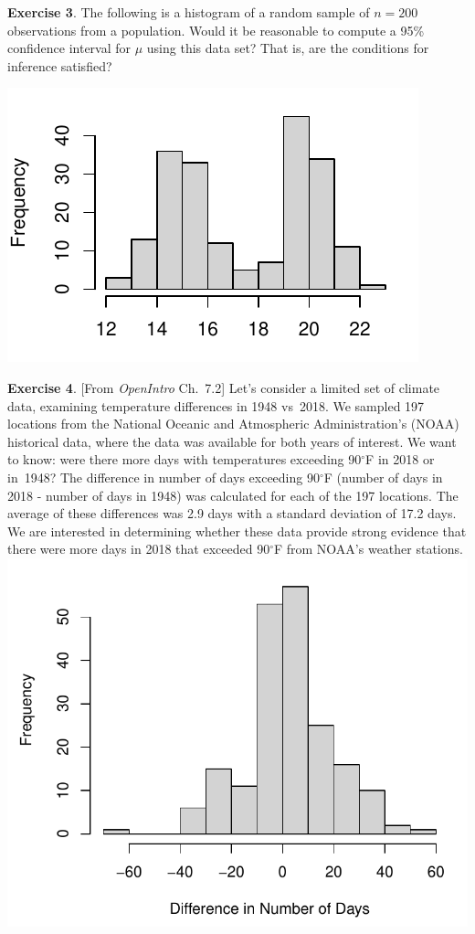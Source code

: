 \documentclass[fleqn, 11pt]{article}\usepackage[]{graphicx}\usepackage[]{color}
\makeatletter
\def\maxwidth{ %
  \ifdim\Gin@nat@width>\linewidth
    \linewidth
  \else
    \Gin@nat@width
  \fi
}
\newenvironment{knitrout}{}{} %
\makeatother
\begin{document}
\textbf{Exercise 3}.  The following is a histogram of a random sample of $n=200$ observations from a population.  Would it be reasonable to compute a 95\% confidence interval for $\mu$ using this data set?  That is, are the conditions for inference satisfied?

\begin{knitrout}
\color{fgcolor}
\includegraphics[width=\maxwidth]{figure/unnamed-chunk-2-1} 
\end{knitrout}

\newpage

\textbf{Exercise 4}. [From \emph{OpenIntro} Ch.~7.2]  Let's consider a limited set of climate data,
examining temperature differences in 1948 vs~2018. We sampled 197 locations from the National Oceanic and Atmospheric Administration's (NOAA) historical data, where the data was available for both years of interest. We want to know: were there more days with temperatures exceeding 90$^{\circ}$F in 2018 or in~1948? The difference in number of days exceeding 90$^{\circ}$F (number of days in 2018 - number of days in 1948) was calculated for each of the 197 locations. The average of these differences was 2.9 days with a standard deviation of 17.2 days. We are interested in determining whether these data provide strong evidence that there were more days in 2018 that exceeded 90$^{\circ}$F from NOAA's weather stations.\\
\includegraphics[scale = 0.5]{diff_hist.pdf}
\end{document}
